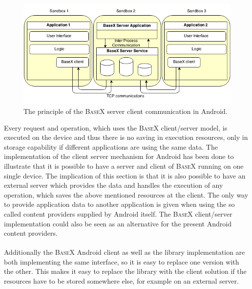 \begin{figure}[h]
\begin{center}
\includegraphics[scale=0.6]{images/basex-server-client.png} 
\caption{The principle of the \textsc{BaseX} server client communication in Android.}
\label{fig:server-client-android}
\end{center}
\end{figure}

Every request and operation, which uses the \textsc{BaseX} client/server model, is executed on the device and thus there is no saving in execution resources, only in storage capability if different applications are using the same data.
The implementation of the client server mechanism for Android has been done to illustrate that it is possible to have a server and client of \textsc{BaseX} running on one single device.
The implication of this section is that it is also possible to have an external server which provides the data and handles the execution of any operation, which saves the above mentioned resources at the client.
The only way to provide application data to another application is given when using the so called content providers supplied by Android itself.
The \textsc{BaseX} client/server implementation could also be seen as an alternative for the present Android content providers.\\
\\
Additionally the \textsc{BaseX} Android client as well as the library implementation are both implementing the same interface, so it is easy to replace one version with the other.
This makes it easy to replace the library with the client solution if the resources have to be stored somewhere else, for example on an external server.



